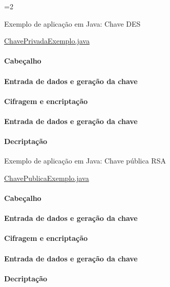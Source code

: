 =2
\begin{frame}[fragile]{Exemplo de aplicação em Java: Chave DES}

\noindent \href{http://book.holanda.xyz/sec/src/crypto/ChavePrivadaExemplo.java}{ChavePrivadaExemplo.java}

 {
\framesubtitle{Cabeçalho}

}  


 {
\framesubtitle{Entrada de dados e geração da chave}

}  


 {
\framesubtitle{Cifragem e encriptação}

}  

 {
\framesubtitle{Entrada de dados e geração da chave}
  
}  

 {
  \framesubtitle{Decriptação}
   
}  



\end{frame}

\begin{frame}[fragile]{Exemplo de aplicação em Java: Chave pública RSA}

\noindent \href{http://book.holanda.xyz/sec/src/crypto/ChavePublicaExemplo.java}{ChavePublicaExemplo.java}

 {
\framesubtitle{Cabeçalho}

}  


 {
\framesubtitle{Entrada de dados e geração da chave}

}  


 {
\framesubtitle{Cifragem e encriptação}

}  

 {
\framesubtitle{Entrada de dados e geração da chave}
  
}  

 {
  \framesubtitle{Decriptação}
   
}  

\end{frame}
\fi

